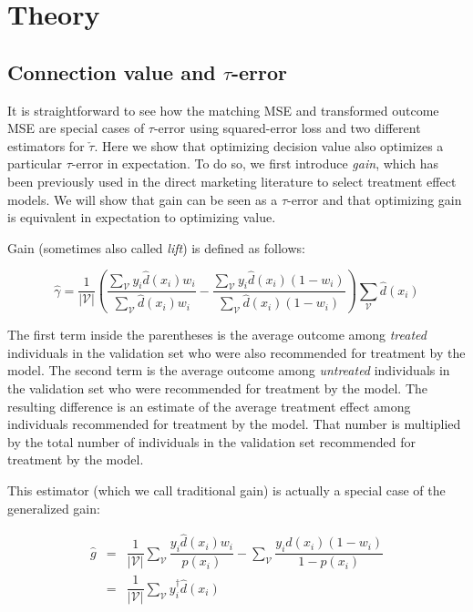 \section{Theory}
\label{theory}

\subsection{Connection value and $\tau$-error}
\label{sec:gain-value}

It is straightforward to see how the matching MSE and transformed outcome MSE are special cases of $\tau$-error using squared-error loss and two different estimators for $\check\tau$. Here we show that optimizing decision value also optimizes a particular $\tau$-error in expectation. To do so, we first introduce \emph{gain}, which has been previously used in the direct marketing literature to select treatment effect models. We will show that gain can be seen as a $\tau$-error and that optimizing gain is equivalent in expectation to optimizing value. 

Gain (sometimes also called \emph{lift}) is defined as follows:

\begin{equation}
\label{gain-basic}
	\hat \gamma = \frac{1}{|\mathcal V |} \left(
		  \frac{\sum_{\mathcal{V}} y_i  \hat d(x_i) w_i}{\sum_{\mathcal{V}}  \hat d(x_i) w_i} - 
		  \frac{\sum_{\mathcal{V}} y_i  \hat d(x_i) (1-w_i)}{\sum_{\mathcal{V}}  \hat d(x_i)  (1-w_i)} 
		  \right)
		  \sum_{\mathcal{V}} \hat d(x_i) 
\end{equation}

The first term inside the parentheses is the average outcome among \emph{treated} individuals in the validation set who were also recommended for treatment by the model. The second term is the average outcome among \emph{untreated} individuals in the validation set who were recommended for treatment by the model. The resulting difference is an estimate of the average treatment effect among individuals recommended for treatment by the model. That number is multiplied by the total number of individuals in the validation set recommended for treatment by the model. 

This estimator (which we call traditional gain) is actually a special case of the generalized gain:

\begin{equation}
\label{gain}
\begin{array}{rcl}
	\hat g & =& \dfrac{1}{|\mathcal V |} \sum_{\mathcal{V}} \dfrac{y_i  \hat d(x_i) w_i}{p(x_i)} - \sum_{\mathcal{V}} \dfrac{y_i  \hat d(x_i) (1-w_i)}{1-p(x_i)} \\
	&=& \dfrac{1}{|\mathcal V |} \sum_{\mathcal{V}} y^{\dagger}_i \hat d(x_i)
\end{array}
\end{equation}


